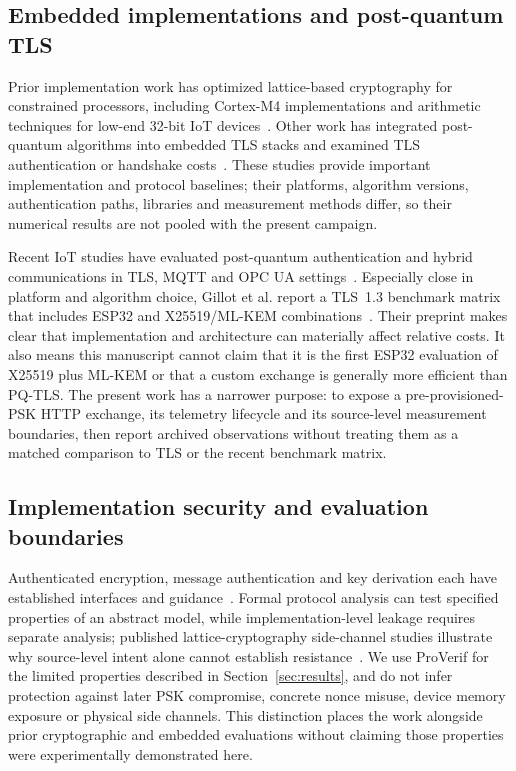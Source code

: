 \documentclass[pdflatex,sn-mathphys-num]{sn-jnl}
\begin{document}
\subsection{Embedded implementations and post-quantum TLS}
Prior implementation work has optimized lattice-based cryptography for constrained processors, including Cortex-M4 implementations and arithmetic techniques for low-end 32-bit IoT devices~\cite{b6,b7,b12,b13}. Other work has integrated post-quantum algorithms into embedded TLS stacks and examined TLS authentication or handshake costs~\cite{b11,b14,b34,b38}. These studies provide important implementation and protocol baselines; their platforms, algorithm versions, authentication paths, libraries and measurement methods differ, so their numerical results are not pooled with the present campaign.

Recent IoT studies have evaluated post-quantum authentication and hybrid communications in TLS, MQTT and OPC UA settings~\cite{b44,b45,b46}. Especially close in platform and algorithm choice, Gillot et al. report a TLS~1.3 benchmark matrix that includes ESP32 and X25519/ML-KEM combinations~\cite{b47}. Their preprint makes clear that implementation and architecture can materially affect relative costs. It also means this manuscript cannot claim that it is the first ESP32 evaluation of X25519 plus ML-KEM or that a custom exchange is generally more efficient than PQ-TLS. The present work has a narrower purpose: to expose a pre-provisioned-PSK HTTP exchange, its telemetry lifecycle and its source-level measurement boundaries, then report archived observations without treating them as a matched comparison to TLS or the recent benchmark matrix.

\subsection{Implementation security and evaluation boundaries}
Authenticated encryption, message authentication and key derivation each have established interfaces and guidance~\cite{b22,b24,b29,b35,b36,b37}. Formal protocol analysis can test specified properties of an abstract model, while implementation-level leakage requires separate analysis; published lattice-cryptography side-channel studies illustrate why source-level intent alone cannot establish resistance~\cite{b18,b40}. We use ProVerif for the limited properties described in Section~\ref{sec:results}, and do not infer protection against later PSK compromise, concrete nonce misuse, device memory exposure or physical side channels. This distinction places the work alongside prior cryptographic and embedded evaluations without claiming those properties were experimentally demonstrated here.
\end{document}
